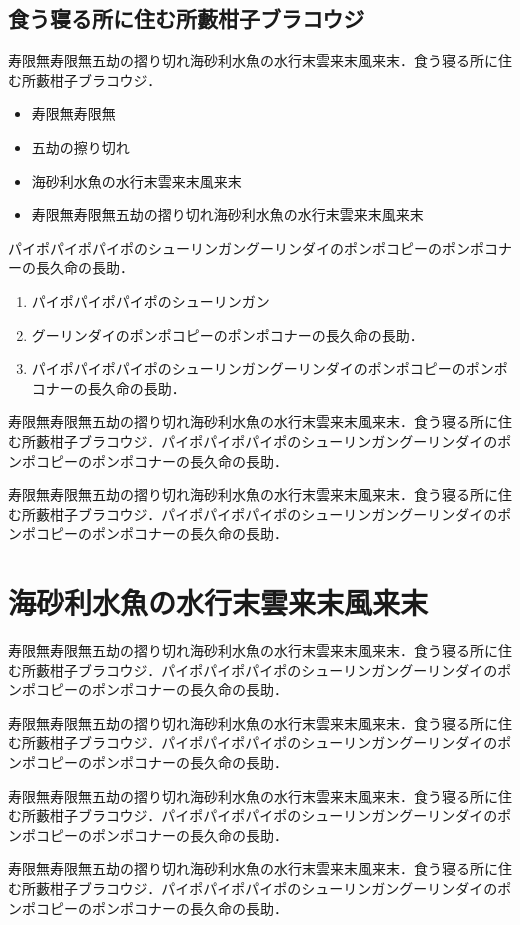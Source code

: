 \documentclass[a4j, 9pt, twocolumn, twoside]{jsarticle}
\begin{document}
\subsection{食う寝る所に住む所藪柑子ブラコウジ}
寿限無寿限無五劫の摺り切れ海砂利水魚の水行末雲来末風来末．食う寝る所に住む所藪柑子ブラコウジ．
\begin{itemize}
  \item 寿限無寿限無 
  \item 五劫の擦り切れ
  \item 海砂利水魚の水行末雲来末風来末
  \item 寿限無寿限無五劫の摺り切れ海砂利水魚の水行末雲来末風来末
\end{itemize}
%
パイポパイポパイポのシューリンガングーリンダイのポンポコピーのポンポコナーの長久命の長助．
\begin{enumerate}
  \item パイポパイポパイポのシューリンガン
  \item グーリンダイのポンポコピーのポンポコナーの長久命の長助．
  \item パイポパイポパイポのシューリンガングーリンダイのポンポコピーのポンポコナーの長久命の長助．
\end{enumerate}
%
寿限無寿限無五劫の摺り切れ海砂利水魚の水行末雲来末風来末．食う寝る所に住む所藪柑子ブラコウジ．パイポパイポパイポのシューリンガングーリンダイのポンポコピーのポンポコナーの長久命の長助．

寿限無寿限無五劫の摺り切れ海砂利水魚の水行末雲来末風来末．食う寝る所に住む所藪柑子ブラコウジ．パイポパイポパイポのシューリンガングーリンダイのポンポコピーのポンポコナーの長久命の長助．

\section{海砂利水魚の水行末雲来末風来末}
寿限無寿限無五劫の摺り切れ海砂利水魚の水行末雲来末風来末．食う寝る所に住む所藪柑子ブラコウジ．パイポパイポパイポのシューリンガングーリンダイのポンポコピーのポンポコナーの長久命の長助．

寿限無寿限無五劫の摺り切れ海砂利水魚の水行末雲来末風来末．食う寝る所に住む所藪柑子ブラコウジ．パイポパイポパイポのシューリンガングーリンダイのポンポコピーのポンポコナーの長久命の長助．

寿限無寿限無五劫の摺り切れ海砂利水魚の水行末雲来末風来末．食う寝る所に住む所藪柑子ブラコウジ．パイポパイポパイポのシューリンガングーリンダイのポンポコピーのポンポコナーの長久命の長助．

寿限無寿限無五劫の摺り切れ海砂利水魚の水行末雲来末風来末．食う寝る所に住む所藪柑子ブラコウジ．パイポパイポパイポのシューリンガングーリンダイのポンポコピーのポンポコナーの長久命の長助．
\end{document}

